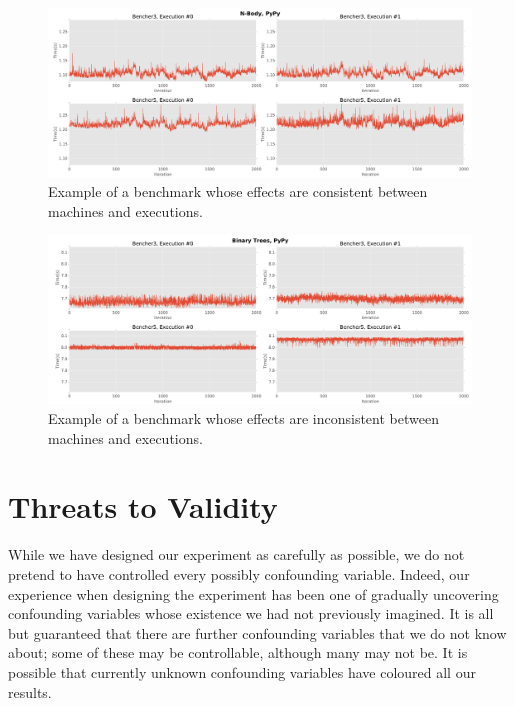 \documentclass[a4paper,UKenglish]{lipics}
\begin{document}
\begin{figure}[h!]
\centering
\includegraphics[width=\textwidth]{examples/consistent_weirdness1}
\caption{Example of a benchmark whose effects are consistent between machines and executions.}
\label{fig:examples:consistent_weirdness1}
\end{figure}

\begin{figure}[h!]
\centering
\includegraphics[width=\textwidth]{examples/inconsistent_weirdness1}
\caption{Example of a benchmark whose effects are inconsistent between machines and executions.}
\label{fig:examples:inconsistent_weirdness1}
\end{figure}


\section{Threats to Validity}
\label{sec:threats}

While we have designed our experiment as carefully as possible, we do not
pretend to have controlled every possibly confounding variable. Indeed, our
experience when designing the experiment has been one of gradually uncovering
confounding variables whose existence we had not previously imagined. It
is all but guaranteed that there are further confounding variables that we
do not know about; some of these may be controllable, although many may not be.
It is possible that currently unknown confounding variables have coloured all
our results.
\end{document}
